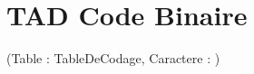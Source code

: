 \documentclass{article}
\begin{document}
\section{TAD Code Binaire}

 (Table : TableDeCodage, Caractere : \motclefCaractere)
\end{document}
